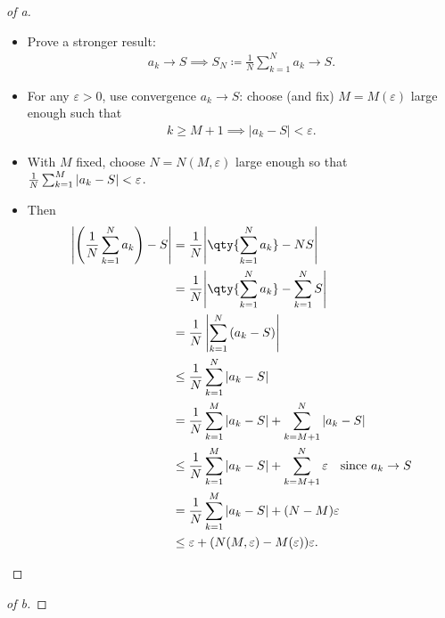 \begin{solution}
\begin{proof}[of a]
\begin{itemize}
\item
  Prove a stronger result:
  \begin{align*}
  a_k \to S \implies S_N\coloneqq\frac 1 N \sum_{k=1}^N a_k \to S
  .\end{align*}
\item
  For any \(\varepsilon> 0\), use convergence \(a_k \to S\): choose (and
  fix) \(M = M(\varepsilon)\) large enough such that
  \begin{align*}
  k\geq M+1 \implies {\left\lvert {a_k - S} \right\rvert} < \varepsilon
  .\end{align*}
\item
  With \(M\) fixed, choose \(N = N(M, \varepsilon)\) large enough so
  that
  \({1\over N} \sum_{k=1}^{M} {\left\lvert {a_k - S} \right\rvert} < \varepsilon\).
\item
  Then
  \begin{align*}
  \left|\left(\frac{1}{N} \sum_{k=1}^{N} a_{k}\right)-S\right| 
  &= {1\over N} {\left\lvert { \qty{\sum_{k=1}^N a_k} - NS  } \right\rvert} \\
  &= {1\over N} {\left\lvert { \qty{\sum_{k=1}^N a_k} - \sum_{k=1}^N S  } \right\rvert} \\
  &=\frac{1}{N}\left|\sum_{k=1}^{N}\left(a_{k}-S\right)\right| \\
  &\leq \frac{1}{N} \sum_{k=1}^{N}\left|a_{k}-S\right| \\
  &= {1\over N} \sum_{k=1}^{M} {\left\lvert {a_k - S} \right\rvert} + \sum_{k=M+1}^N {\left\lvert {a_k - S} \right\rvert} \\
  &\leq {1\over N} \sum_{k=1}^{M} {\left\lvert {a_k - S} \right\rvert} + \sum_{k=M+1}^N {\varepsilon} \quad \text{since } a_k \to S\\
  &= {1\over N} \sum_{k=1}^{M} {\left\lvert {a_k - S} \right\rvert} + (N - M){\varepsilon} \\
  &\leq \varepsilon+ (N(M, \varepsilon) - M(\varepsilon))\varepsilon
  .\end{align*}
\end{itemize}

\end{proof}


\begin{proof}[of b]

\envlist


\end{proof}
\end{solution}
